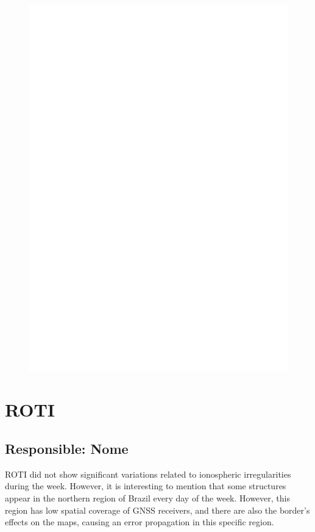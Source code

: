 \documentclass[a4paper, 10pt]{article}
\begin{document}
    
    \begin{figure}[H]
        \centering
        \includegraphics[width=14cm]{./figures/en_outfileScint_1.jpg}
    \end{figure} 
 

    \section{ROTI} 
 \subsection{Responsible: Nome} 
 
ROTI did not show significant variations related to ionospheric irregularities during the week. However, it is interesting to mention that some structures appear in the northern region of Brazil every day of the week. However, this region has low spatial coverage of GNSS receivers, and there are also the border's effects on the maps, causing an error propagation in this specific region.
\end{document}
